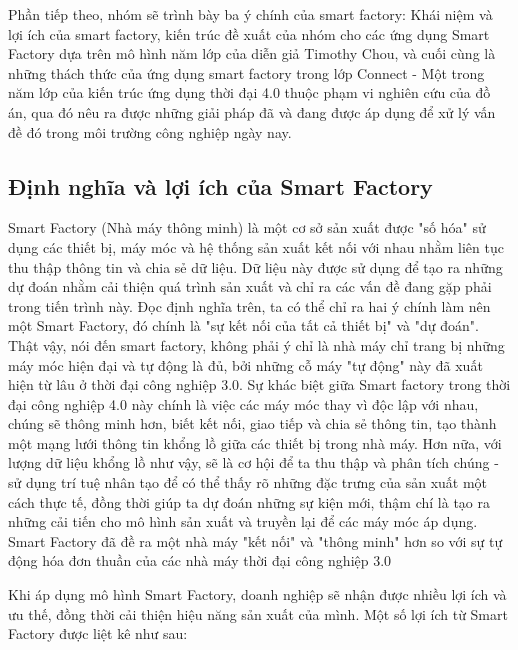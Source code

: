 Phần tiếp theo, nhóm sẽ trình bày ba ý chính của smart factory: Khái niệm và lợi ích của smart factory, kiến trúc đề xuất của nhóm cho các ứng dụng Smart Factory dựa trên mô hình năm lớp của diễn giả Timothy Chou, và cuối cùng là những thách thức của ứng dụng smart factory trong lớp Connect - Một trong năm lớp của kiến trúc ứng dụng thời đại 4.0 thuộc phạm vi nghiên cứu của đồ án, qua đó nêu ra được những giải pháp đã và đang được áp dụng để xử lý vấn đề đó trong môi trường công nghiệp ngày nay. 

\subsection{Định nghĩa và lợi ích của Smart Factory}

Smart Factory (Nhà máy thông minh) là một cơ sở sản xuất được "số hóa" sử dụng các thiết bị, máy móc và hệ thống sản xuất kết nối với nhau nhằm liên tục thu thập thông tin và chia sẻ dữ liệu. Dữ liệu này được sử dụng để tạo ra những dự đoán nhằm cải thiện quá trình sản xuất và chỉ ra các vấn đề đang gặp phải trong tiến trình này. Đọc định nghĩa trên, ta có thể chỉ ra hai ý chính làm nên một Smart Factory, đó chính là "sự kết nối của tất cả thiết bị" và "dự đoán". Thật vậy, nói đến smart factory, không phải ý chỉ là nhà máy chỉ trang bị những máy móc hiện đại và tự động là đủ, bởi những cỗ máy "tự động" này đã xuất hiện từ lâu ở thời đại công nghiệp 3.0. Sự khác biệt giữa Smart factory trong thời đại công nghiệp 4.0 này chính là việc các máy móc thay vì độc lập với nhau, chúng sẽ thông minh hơn, biết kết nối, giao tiếp và chia sẻ thông tin, tạo thành một mạng lưới thông tin khổng lồ giữa các thiết bị trong nhà máy. Hơn nữa, với lượng dữ liệu khổng lồ như vậy, sẽ là cơ hội để ta thu thập và phân tích chúng - sử dụng trí tuệ nhân tạo để có thể thấy rõ những đặc trưng của sản xuất một cách thực tế, đồng thời giúp ta dự đoán những sự kiện mới, thậm chí là tạo ra những cải tiến cho mô hình sản xuất và truyền lại để các máy móc áp dụng. Smart Factory đã đề ra một nhà máy "kết nối" và "thông minh" hơn so với sự tự động hóa đơn thuần của các nhà máy thời đại công nghiệp 3.0

Khi áp dụng mô hình Smart Factory, doanh nghiệp sẽ nhận được nhiều lợi ích và ưu thế, đồng thời cải thiện hiệu năng sản xuất của mình. Một số lợi ích từ Smart Factory được liệt kê như sau:

